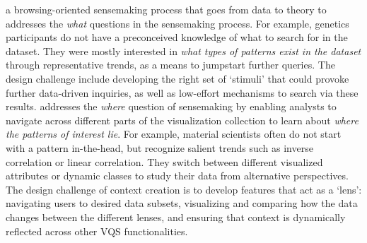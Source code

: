 a browsing-oriented sensemaking process 
that goes from data to theory to 
addresses the \textit{what} questions 
in the sensemaking process.
 For example, genetics participants do not 
 have a preconceived knowledge of what to search 
 for in the dataset. 
 They were mostly interested in 
 \textit{what types of patterns exist in the dataset} 
 through representative trends, as a means to 
 jumpstart further queries. %
The design challenge include developing 
the right set of `stimuli' that could 
provoke further data-driven inquiries, 
as well as low-effort mechanisms to search via these results.
 addresses the \textit{where} 
question of sensemaking by enabling analysts 
to navigate across different parts of the visualization 
collection to learn about \textit{where the patterns of interest lie}. 
For example, material scientists often do not start 
with a pattern in-the-head, but recognize salient 
trends such as inverse correlation or linear correlation. 
They switch between different visualized attributes or dynamic 
classes to study their data from alternative perspectives. 
The design challenge of context creation is to develop 
features that act as a `lens': navigating users to desired data subsets, 
visualizing and comparing how the data changes between the different lenses, and ensuring that context is dynamically reflected across other VQS functionalities.
